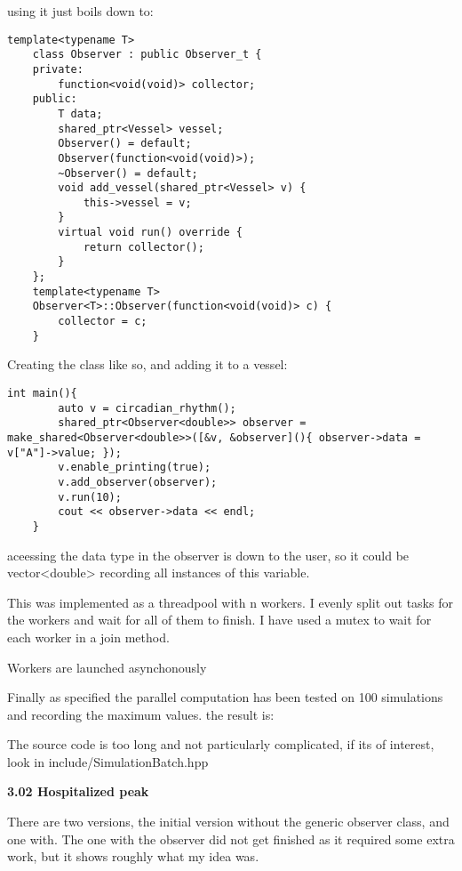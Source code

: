 using it just boils down to:

\begin{lstlisting}[style=colorC++]
    template<typename T>
    class Observer : public Observer_t {
    private:
        function<void(void)> collector;
    public:
        T data;
        shared_ptr<Vessel> vessel;
        Observer() = default;
        Observer(function<void(void)>);
        ~Observer() = default;
        void add_vessel(shared_ptr<Vessel> v) {
            this->vessel = v;
        }
        virtual void run() override {
            return collector();
        }
    };
    template<typename T>
    Observer<T>::Observer(function<void(void)> c) {
        collector = c;
    }
\end{lstlisting}

Creating the class like so, and adding it to a vessel:

\begin{lstlisting}[style=colorC++]
    int main(){
        auto v = circadian_rhythm();
        shared_ptr<Observer<double>> observer = make_shared<Observer<double>>([&v, &observer](){ observer->data = v["A"]->value; });
        v.enable_printing(true);
        v.add_observer(observer);
        v.run(10);
        cout << observer->data << endl;
    }
\end{lstlisting}

aceessing the data type in the observer is down to the user, so it could be vector<double> recording all instances of this variable.

This was implemented as a threadpool with n workers. I evenly split out tasks for the workers and wait for all of them to finish. I have used a mutex to wait for each worker in a join method. 

Workers are launched asynchonously

Finally as specified the parallel computation has been tested on 100 simulations and recording the maximum values. the result is:

The source code is too long and not particularly complicated, if its of interest, look in include/SimulationBatch.hpp

\textbf{3.02 Hospitalized peak}

There are two versions, the initial version without the generic observer class, and one with. The one with the observer did not get finished as it required some extra work, but it shows roughly what my idea was.

